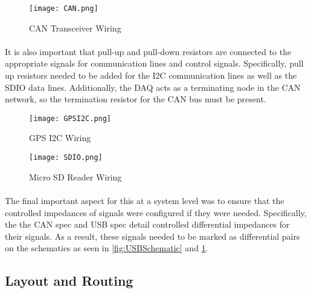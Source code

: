 \begin{figure}[H]
	\centering
	\texttt{[image: CAN.png]}
	\caption{CAN Transceiver Wiring}
	\label{fig:CANSchematic}
\end{figure}

\paragraph{}
It is also important that pull-up and pull-down resistors are connected to the appropriate signals for communication lines and control signals.
Specifically, pull up resistors needed to be added for the I2C communication lines as well as the SDIO data lines.
Additionally, the DAQ acts as a terminating node in the CAN network, so the termination resistor for the CAN bus must be present.

\begin{figure}[H]
	\centering
	\texttt{[image: GPSI2C.png]}
	\caption{GPS I2C Wiring}
	\label{fig:I2CSchematic}
\end{figure}

\begin{figure}[H]
	\centering
	\texttt{[image: SDIO.png]}
	\caption{Micro SD Reader Wiring}
	\label{fig:SDSchematic}
\end{figure}

\paragraph{}
The final important aspect for this at a system level was to ensure that the controlled impedances of signals were configured if they were needed.
Specifically, the the CAN spec and USB spec detail controlled differential impedances for their signals.
As a result, these signals needed to be marked as differential pairs on the schematics as seen in \cref{fig:USBSchematic} and \cref{fig:CANSchematic}.

\subsection{Layout and Routing}

